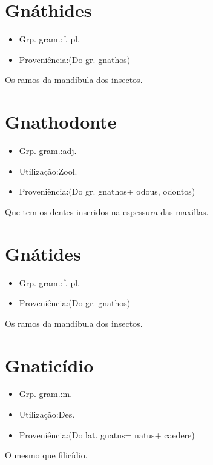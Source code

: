 \section{Gnáthides}
\begin{itemize}
\item {Grp. gram.:f. pl.}
\end{itemize}
\begin{itemize}
\item {Proveniência:(Do gr. \textunderscore gnathos\textunderscore )}
\end{itemize}
Os ramos da mandíbula dos insectos.
\section{Gnathodonte}
\begin{itemize}
\item {Grp. gram.:adj.}
\end{itemize}
\begin{itemize}
\item {Utilização:Zool.}
\end{itemize}
\begin{itemize}
\item {Proveniência:(Do gr. \textunderscore gnathos\textunderscore  + \textunderscore odous\textunderscore , \textunderscore odontos\textunderscore )}
\end{itemize}
Que tem os dentes inseridos na espessura das maxillas.
\section{Gnátides}
\begin{itemize}
\item {Grp. gram.:f. pl.}
\end{itemize}
\begin{itemize}
\item {Proveniência:(Do gr. \textunderscore gnathos\textunderscore )}
\end{itemize}
Os ramos da mandíbula dos insectos.
\section{Gnaticídio}
\begin{itemize}
\item {Grp. gram.:m.}
\end{itemize}
\begin{itemize}
\item {Utilização:Des.}
\end{itemize}
\begin{itemize}
\item {Proveniência:(Do lat. \textunderscore gnatus\textunderscore  = \textunderscore natus\textunderscore  + \textunderscore caedere\textunderscore )}
\end{itemize}
O mesmo que \textunderscore filicídio\textunderscore .
